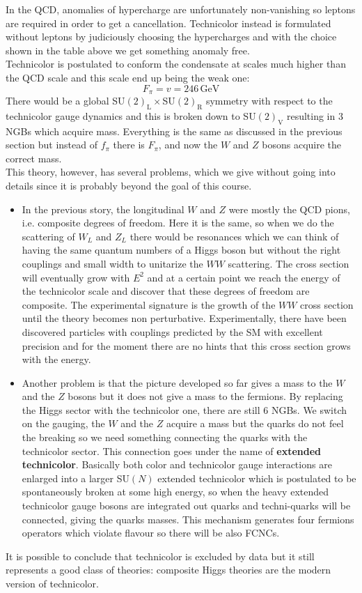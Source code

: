 \documentclass[../main.tex]{subfiles}
\begin{document}
In the QCD, anomalies of hypercharge are unfortunately non-vanishing so leptons are required in order to get a cancellation. Technicolor instead is formulated without leptons by judiciously choosing the hypercharges and with the choice shown in the table above we get something anomaly free.\\ Technicolor is postulated to conform the condensate at scales much higher than the QCD scale and this scale end up being the weak one: 
\[
F_\pi=v=246\,\text{GeV}
\]
There would be a global SU$(2)_{\text{L}}\times$SU$(2)_{\text{R}}$ symmetry with respect to the technicolor gauge dynamics and this is broken down to SU$(2)_{\text{V}}$ resulting in 3 NGBs which acquire mass. Everything is the same as discussed in the previous section but instead of $f_\pi$ there is $F_\pi$, and now the $W$ and $Z$ bosons acquire the correct mass.\\
This theory, however, has several problems, which we give without going into details since it is probably beyond the goal of this course.
\begin{itemize}
    \item In the previous story, the longitudinal $W$ and $Z$ were mostly the QCD pions, i.e. composite degrees of freedom. Here it is the same, so when we do the scattering of $W_L$ and $Z_L$ there would be resonances which we can think of having the same quantum numbers of a Higgs boson but without the right couplings and small width to unitarize the $WW$ scattering. The cross section will eventually grow with $E^2$ and at a certain point we reach the energy of the technicolor scale and discover that these degrees of freedom are composite.
    The experimental signature is the growth of the $WW$ cross section until the theory becomes non perturbative.
    Experimentally, there have been discovered particles with couplings predicted by the SM with excellent precision and for the moment there are no hints that this cross section grows with the energy.
    \item Another problem is that the picture developed so far gives a mass to the $W$ and the $Z$ bosons but it does not give a mass to the fermions. By replacing the Higgs sector with the technicolor one, there are still 6 NGBs. We switch on the gauging, the $W$ and the $Z$ acquire a mass but the quarks do not feel the breaking so we need something connecting the quarks with the technicolor sector. This connection goes under the name of \textbf{extended technicolor}. Basically both color and technicolor gauge interactions are enlarged into a larger SU$(N)$ extended technicolor which is postulated to be spontaneously broken at some high energy, so when the heavy extended technicolor gauge bosons are integrated out quarks and techni-quarks will be connected, giving the quarks masses. This mechanism generates four fermions operators which violate flavour so there will be also FCNCs.
\end{itemize}
It is possible to conclude that technicolor is excluded by data but it still represents a good class of theories: composite Higgs theories are the modern version of technicolor. 
\end{document}
